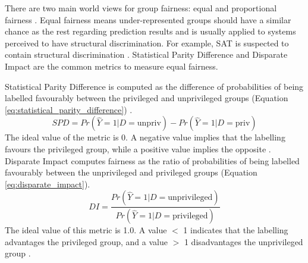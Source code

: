 \documentclass[sigconf]{acmart}
\begin{document}
	There are two main world views for group fairness: equal and proportional fairness \cite{mahoney2020ai,ibmaif3602022guidance}. Equal fairness means under-represented groups should have a similar chance as the rest regarding prediction results and is usually applied to systems perceived to have structural discrimination. For example, SAT is suspected to contain structural discrimination \cite{mahoney2020ai,ibmaif3602022guidance}. Statistical Parity Difference \cite{dwork2012fairness,mahoney2020ai,ibmaif3602022guidance} and Disparate Impact \cite{feldman2015disparate,mahoney2020ai,ibmaif3602022guidance} are the common metrics to measure equal fairness. 
	
	Statistical Parity Difference is computed as the difference of probabilities of being labelled favourably between the privileged and unprivileged groups (Equation \ref{eq:statistical_parity_difference}) \cite{dwork2012fairness,ibmaif3602022doc,bellamy2018ai}. 
	\begin{equation} \label{eq:statistical_parity_difference}
		SPD = Pr(\hat{Y} = 1 | D = \text{unpriv})
		- Pr(\hat{Y} = 1 | D = \text{priv})
	\end{equation}
	The ideal value of the metric is 0. A negative value implies that the labelling favours the privileged group, while a positive value implies the opposite \cite{ibmaif3602022doc,bellamy2018ai}. Disparate Impact \cite{feldman2015disparate,ibmaif3602022doc,bellamy2018ai} computes fairness as the ratio of probabilities of being labelled favourably between the unprivileged and privileged groups (Equation \ref{eq:disparate_impact}).
	\begin{equation} \label{eq:disparate_impact}
		DI = \frac{Pr(\hat{Y} = 1 | D = \text{unprivileged})}
		{Pr(\hat{Y} = 1 | D = \text{privileged})}
	\end{equation}
	The ideal value of this metric is 1.0. A value $<$ 1 indicates that the labelling advantages the privileged group, and a value $>$ 1 disadvantages the unprivileged group \cite{ibmaif3602022doc,bellamy2018ai}.
	
\end{document}
